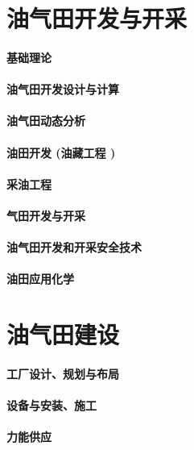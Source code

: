 \documentclass[UTF8]{../../ApplicationUniverse}
\begin{document}
\chapter{油气田开发与开采}
\subsubsection{基础理论}
\subsubsection{油气田开发设计与计算}
\subsubsection{油气田动态分析}
\subsubsection{油田开发 (油藏工程 )}
\subsubsection{采油工程}
\subsubsection{气田开发与开采}
\subsubsection{油气田开发和开采安全技术}
\subsubsection{油田应用化学}





\chapter{油气田建设}
\subsubsection{工厂设计、规划与布局}
\subsubsection{设备与安装、施工}
\subsubsection{力能供应}
\end{document}
